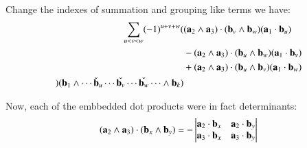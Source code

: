 \documentclass{article}      %
\begin{document}
Change the indexes of summation and grouping like terms we have:
\begin{align*}
\sum_{u<v<w} (-1)^{u+v+w} 
(
&(\mathbf{a}_2 \wedge \mathbf{a}_3) \cdot (\mathbf{b}_v \wedge \mathbf{b}_w) (\mathbf{a}_1 \cdot \mathbf{b}_u)  \\
&-(\mathbf{a}_2 \wedge \mathbf{a}_3) \cdot (\mathbf{b}_u \wedge \mathbf{b}_w) (\mathbf{a}_1 \cdot \mathbf{b}_v)  \\
&+(\mathbf{a}_2 \wedge \mathbf{a}_3) \cdot (\mathbf{b}_u \wedge \mathbf{b}_v) (\mathbf{a}_1 \cdot \mathbf{b}_w)  \\
) 
(\mathbf{b}_1 \wedge \cdots \check {\mathbf{b}}_u \cdots \check{\mathbf{b}_v} \cdots \check{\mathbf{b}_w} \cdots \wedge \mathbf{b}_k)  \\
\end{align*}

Now, each of the embbedded dot products were in fact determinants:
\[
(\mathbf{a}_2 \wedge \mathbf{a}_3) \cdot (\mathbf{b}_x \wedge \mathbf{b}_y)
=
-
\begin{vmatrix}
\mathbf{a}_2 \cdot \mathbf{b}_x & \mathbf{a}_2 \cdot \mathbf{b}_y \\
\mathbf{a}_3 \cdot \mathbf{b}_x & \mathbf{a}_3 \cdot \mathbf{b}_y \\
\end{vmatrix}
\]
\end{document}
